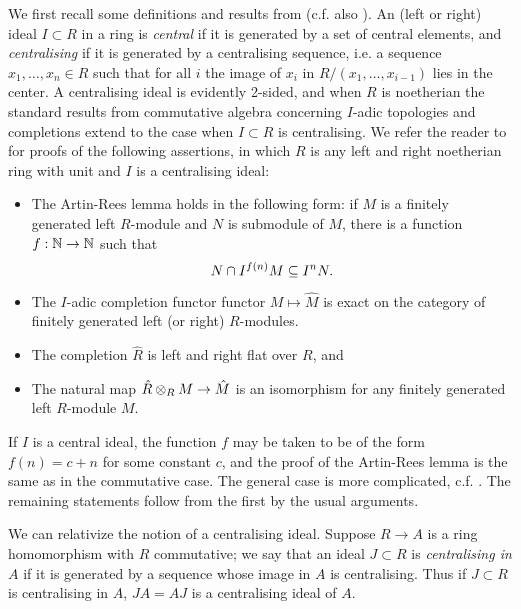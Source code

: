\documentclass{article}
\theoremstyle{change}
\numberwithin{equation}{subsubsection}
\begin{document}
We    first    recall    some    definitions    and    results    from
\cite{nastasescu-van-oystaeyen:1982}             (c.f.            also
\cite[\S3.2]{berthelot:1996}). An  (left or right) ideal  $I\subset R$
in a ring is  \textit{central} if it is generated by  a set of central
elements,  and   \textit{centralising}  if   it  is  generated   by  a
centralising sequence, i.e. a sequence $x_1,\ldots,x_n\in R$ such that
for all $i$ the image of $x_i$ in $R/(x_1,\ldots,x_{i-1})$ lies in the
center. A  centralising ideal  is evidently 2-sided,  and when  $R$ is
noetherian the  standard results  from commutative  algebra concerning
$I$-adic  topologies   and  completions   extend  to  the   case  when
$I\subset  R$  is  centralising.  We   refer  the  reader  to  \cite[D
III]{nastasescu-van-oystaeyen:1982}  for   proofs  of   the  following
assertions, in  which $R$ is any  left and right noetherian  ring with
unit and $I$ is a centralising ideal:
\begin{itemize}
\item The Artin-Rees lemma holds in the following form: if $M$ is a
  finitely generated left $R$-module and $N$ is submodule of $M$,
  there is a function $f:{\mathbb N}\to{\mathbb N}$ such that
  \begin{displaymath}
    N\cap I^{f(n)}M\subseteq I^nN.
  \end{displaymath}
\item The $I$-adic completion functor functor $M\mapsto\hat M$ is
  exact on the category of finitely generated left (or right)
  $R$-modules.
\item The completion $\hat R$ is left and right flat over $R$, and 
\item The natural map $\hat R\otimes_RM\to\hat M$ is an isomorphism for
  any finitely generated left $R$-module $M$.
\end{itemize}
If $I$ is a central ideal, the function $f$ may be taken to be of the
form $f(n)=c+n$ for some constant $c$, and the proof of the Artin-Rees
lemma is the same as in the commutative case. The general case is more
complicated, c.f. \cite[D V]{nastasescu-van-oystaeyen:1982}. The
remaining statements follow from the first by the usual arguments.

We can relativize the notion of a centralising ideal. Suppose $R\to A$
is a ring homomorphism with $R$ commutative; we say that an ideal
$J\subset R$ is \textit{centralising in $A$} if it is generated by a
sequence whose image in $A$ is centralising. Thus if $J\subset R$ is
centralising in $A$, $JA=AJ$ is a centralising ideal of $A$.
\end{document}
